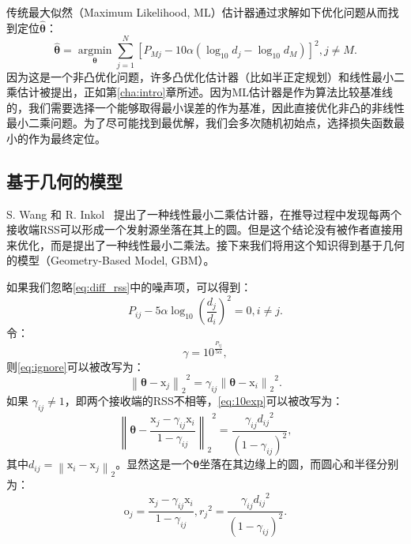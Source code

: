 传统最大似然（Maximum Likelihood, ML）估计器通过求解如下优化问题从而找到定位$\bm{\hat{\theta}}$：
\begin{equation}
\widehat {\bm{\theta }} = \mathop {\arg \min }\limits_{\bm{\theta }} \sum\limits_{j = 1}^N {{{[{P_{Mj}} - 10\alpha ({{\log }_{10}}d_j - {{\log }_{10}}d_M)]}^2}}, j \neq M. \label{eq:ml}
\end{equation}
因为这是一个非凸优化问题，许多凸优化估计器（比如半正定规划）和线性最小二乘估计被提出，正如第\ref{cha:intro}章所述。因为ML估计器是作为算法比较基准线的，我们需要选择一个能够取得最小误差的作为基准，因此直接优化非凸的非线性最小二乘问题。为了尽可能找到最优解，我们会多次随机初始点，选择损失函数最小的作为最终定位。

\subsection{基于几何的模型}

S. Wang 和 R. Inkol~\cite{wang2011near} 提出了一种线性最小二乘估计器，在推导过程中发现每两个接收端RSS可以形成一个发射源坐落在其上的圆。但是这个结论没有被作者直接用来优化，而是提出了一种线性最小二乘法。接下来我们将用这个知识得到基于几何的模型（Geometry-Based Model, GBM）。

如果我们忽略\eqref{eq:diff_rss}中的噪声项，可以得到：
\begin{equation}
{P_{ij}} - 5\alpha {\log _{10}}({\dfrac{d_j}{d_i}})^2 = 0, i \neq j. \label{eq:ignore}
\end{equation}
令：
\begin{equation}
\gamma = 10^{\frac{P_{ij}}{5\alpha}}, \label{eq:gamma}
\end{equation}
则\eqref{eq:ignore}可以被改写为：
\begin{equation}
{\left\| {\bm{\theta}  - \bm{\mathrm{x}}_j} \right\|_2}^2 = {\gamma _{ij}}{\left\| {\bm{\theta}  - \bm{\mathrm{x}}_i} \right\|_2}^2. \label{eq:10exp}
\end{equation}
如果 $\gamma _{ij} \neq 1$，即两个接收端的RSS不相等，\eqref{eq:10exp}可以被改写为：
\begin{equation}
{\left\| {\bm{\theta}  - \frac{\bm{\mathrm{x}}_j - \gamma_{ij}\bm{\mathrm{x}}_i}{1 - \gamma_{ij}}} \right\|_2}^2 = \frac{\gamma_{ij}{d_{ij}}^2}{(1 - \gamma_{ij})^2}, \label{eq:circle}
\end{equation}
其中$d_{ij} = \left\| \bm{\mathrm{x}}_i  - \bm{\mathrm{x}}_j \right\|_2$。显然这是一个$\bm{\theta}$坐落在其边缘上的圆，而圆心和半径分别为：
\begin{equation}
\bm{\mathrm{o}}_j = \frac{\bm{\mathrm{x}}_j - \gamma_{ij}\bm{\mathrm{x}}_i}{1 - \gamma_{ij}}, {r_j}^2 = \frac{\gamma_{ij}{d_{ij}}^2}{(1 - \gamma_{ij})^2}. \label{eq:oR}
\end{equation}

